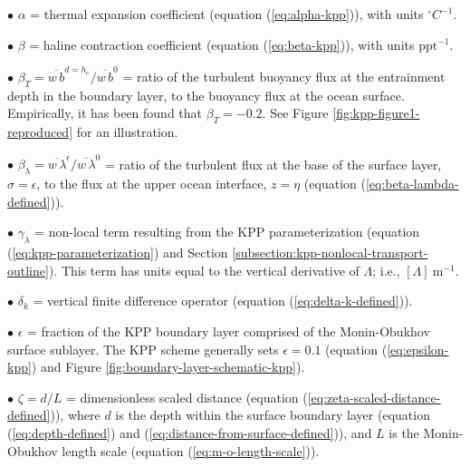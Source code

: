 \vspace{.1cm}
\begin{trivlist}

\item[$\bullet$] $\alpha$ = thermal expansion coefficient (equation
  (\ref{eq:alpha-kpp})), with units $\mbox{}^{\circ}C^{-1}$.

\item[$\bullet$] $\beta$ = haline contraction coefficient (equation
  (\ref{eq:beta-kpp})), with units $\mbox{ppt}^{-1}$.

\item[$\bullet$] $\beta_{T} = \overline{w \, b}^{d=h_{e}} /
  \overline{w \, b}^{0}$ = ratio of the turbulent buoyancy flux at the
  entrainment depth in the boundary layer, to the buoyancy flux at the
  ocean surface.  Empirically, it has been found that $\beta_{T} =
  -0.2$.  See Figure \ref{fig:kpp-figure1-reproduced} for an
  illustration.

\item[$\bullet$] $\beta_{\lambda} = \overline{w \,
    \lambda}^{\epsilon}/ \overline{w \, \lambda}^{0}$ = ratio of
  the turbulent flux at the base of the surface layer, $\sigma =
  \epsilon$, to the flux at the upper ocean interface, $z=\eta$
  (equation (\ref{eq:beta-lambda-defined})).

\item[$\bullet$] $\gamma_{\lambda}$ = non-local term resulting from the KPP
  parameterization (equation (\ref{eq:kpp-parameterization}) and
  Section \ref{subsection:kpp-nonlocal-transport-outline}).  This term
  has units equal to the vertical derivative of $\Lambda$; i.e.,
  $[\Lambda]~\mbox{m}^{-1}$.

\item[$\bullet$] $\delta_k$ = vertical finite difference operator
  (equation (\ref{eq:delta-k-defined})).

\item[$\bullet$] $\epsilon$ = fraction of the KPP boundary layer
  comprised of the Monin-Obukhov surface sublayer.  The KPP scheme
  generally sets $\epsilon=0.1$ (equation (\ref{eq:epsilon-kpp}) and
  Figure \ref{fig:boundary-layer-schematic-kpp}).

\item[$\bullet$] $\zeta = d/L$ = dimensionless scaled distance
  (equation (\ref{eq:zeta-scaled-distance-defined})), where $d$ is the
  depth within the surface boundary layer (equation
  (\ref{eq:depth-defined}) and
  (\ref{eq:distance-from-surface-defined})), and $L$ is the
  Monin-Obukhov length scale (equation (\ref{eq:m-o-length-scale})).


\end{trivlist}
